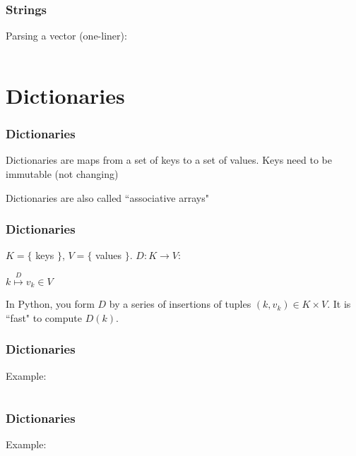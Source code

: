 \documentclass{beamer}
\begin{document}
\begin{frame}
\frametitle{Strings}
Parsing a vector (one-liner):
\begin{center}
\begin{tabular}{c}

\end{tabular}
\end{center}

\end{frame}


\section{Dictionaries}

\begin{frame}
\frametitle{Dictionaries}

Dictionaries are maps from a set of keys to a set of values.  Keys need to be immutable (not changing)

\vspace{0.2in}

Dictionaries are also called ``associative arrays"
\end{frame}


\begin{frame}
\frametitle{Dictionaries}

$K = \{$ keys $\}$, $V = \{$ values $\}$.  $D: K \rightarrow V$:

\huge{
\begin{center}
$k \stackrel{D}{\longmapsto} v_k \in V$
\end{center}
} \normalsize{}

\vspace{0.2in}

In Python, you form $D$ by a series of insertions of tuples $(k, v_k) \in K \times V$.  It is ``fast" to compute $D(k)$.

\end{frame}

\begin{frame}
\frametitle{Dictionaries}

Example:

\begin{center}
\begin{tabular}{c}

\end{tabular}
\end{center}

\end{frame}


\begin{frame}
\frametitle{Dictionaries}

Example:

\begin{center}
\begin{tabular}{c}

\end{tabular}
\end{center}

\end{frame}
\end{document}
